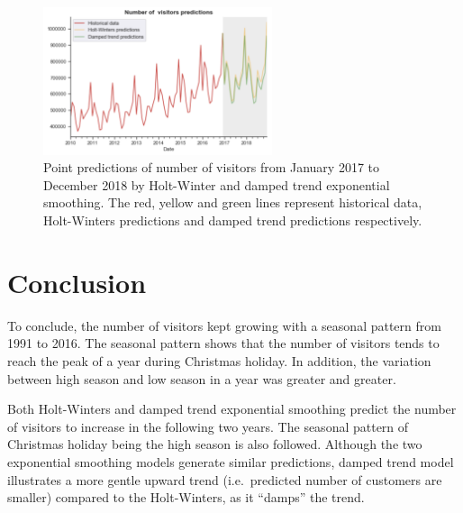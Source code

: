 \documentclass[letterpaper,12pt,twoside,]{pinp}
\begin{document}
\begin{figure}[h]
\includegraphics[width=0.6\textwidth]{predictions.png}
\centering
\caption{Point predictions of number of visitors from January 2017 to December 2018 by Holt-Winter and damped trend exponential smoothing. The red, yellow and green lines represent historical data, Holt-Winters predictions and damped trend predictions respectively.}
\label{fig:predictions}
\end{figure}

\hypertarget{conclusion}{%
\section{Conclusion}\label{conclusion}}

To conclude, the number of visitors kept growing with a seasonal pattern
from 1991 to 2016. The seasonal pattern shows that the number of
visitors tends to reach the peak of a year during Christmas holiday. In
addition, the variation between high season and low season in a year was
greater and greater.

Both Holt-Winters and damped trend exponential smoothing predict the
number of visitors to increase in the following two years. The seasonal
pattern of Christmas holiday being the high season is also followed.
Although the two exponential smoothing models generate similar
predictions, damped trend model illustrates a more gentle upward trend
(i.e.~predicted number of customers are smaller) compared to the
Holt-Winters, as it ``damps'' the trend.





\end{document}
